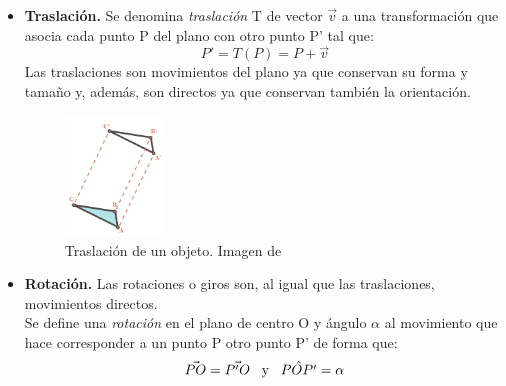 \documentclass[a4paper, openright, 11pt, titlepage]{report}
\theoremstyle{definition}\newtheorem{defin}[propo]{Definition}
\theoremstyle{definition}\newtheorem{obser}[propo]{Remark}
\theoremstyle{definition}\newtheorem{ejem}[propo]{Ejemplo}
\theoremstyle{definition}\newtheorem{algoritmo}[propo]{Algoritmo}
\begin{document}
\begin{itemize}
    \item \textbf{Traslación.} Se denomina \textit{traslación} T de vector $\Vec{v}$ a una transformación que asocia cada punto P del plano con otro punto P' tal que: $$P' = T(P) = P + \Vec{v}$$
    Las traslaciones son movimientos del plano ya que conservan su forma y tamaño y, además, son directos ya que conservan también la orientación.
    \begin{figure}[H]
        \centering
        \includegraphics[width = 0.25\textwidth]{traslacion.png}
        \caption{Traslación de un objeto. Imagen de \cite{sangaku}}
    \end{figure}
    \item \textbf{Rotación.} Las rotaciones o giros son, al igual que las traslaciones, movimientos directos.\\
    Se define una \textit{rotación} en el plano de centro O y ángulo $\alpha$ al movimiento que hace corresponder a un punto P otro punto P' de forma que: 
    $$\Vec{PO} = \Vec{P'O} \hspace{0.3cm} \text{y} \hspace{0.3cm} \hat{POP'} = \alpha$$
        \begin{figure}[H]
            \centering

\end{figure}
\end{itemize}
\end{document}
